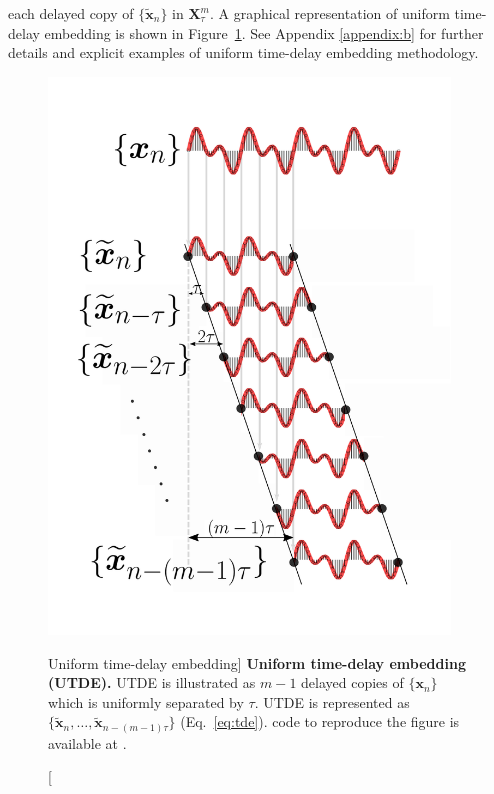 each delayed copy 
of $\{ \boldsymbol{ \tilde{x} }_n \}$ in $\boldsymbol{X}^{m}_{\tau}$.
A graphical representation of uniform time-delay embedding is shown in 
Figure~\ref{fig:utde}. See Appendix \ref{appendix:b} for further details 
and explicit examples of uniform time-delay embedding methodology. 
\begin{figure}
 \centering
   \includegraphics[width=0.95\textwidth]{fig_3_02}
   \caption
	[Uniform time-delay embedding]{
	{\bf Uniform time-delay embedding (UTDE).} 
	UTDE is illustrated as $m-1$ delayed copies
   	of $\{ \boldsymbol{x}_n \}$ which is uniformly separated by $\tau$.
	UTDE is represented as
	$\{ \boldsymbol{ \tilde{x} }_n, \dots,  
	\boldsymbol{ \tilde{x} }_{n -(m-1)\tau}   \}$ (Eq.~\ref{eq:tde}).
	\R code to reproduce the figure is available at 
	.
   }
   \label{fig:utde}
\end{figure}

